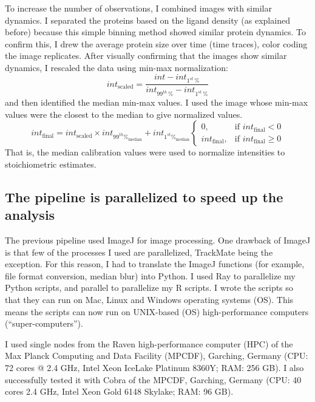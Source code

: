To increase the number of observations, I combined images with similar dynamics. I separated the proteins based on the ligand density (as explained before) because this simple binning method showed similar protein dynamics. To confirm this, I drew the average protein size over time (time traces), color coding the image replicates. After visually confirming that the images show similar dynamics, I rescaled the data using min-max normalization:
\begin{equation*}
int_\text{scaled} = \frac{int - int_{1^{st}\,\%}}{int_{99^{th}\,\%} - int_{1^{st}\,\%}}
\end{equation*}
and then identified the median min-max values. I used the image whose min-max values were the closest to the median to give normalized values.
\begin{equation*}
int_\text{final} = int_\text{scaled} \times int_{99^{th} \%_\text{median}}+int_{1^{st} \%_\text{median}}
\left\{\begin{array}{lr}
0, & \text{if }int_\text{final} < 0\\
int_\text{final}, & \text{if }int_\text{final} \geq 0
\end{array}\right.
\end{equation*}
That is, the median calibration values were used to normalize intensities to stoichiometric estimates.

\subsection{The pipeline is parallelized to speed up the analysis}
The previous pipeline used ImageJ for image processing. One drawback of ImageJ is that few of the processes I used are parallelized, TrackMate being the exception. For this reason, I had to translate the ImageJ functions (for example, file format conversion, median blur) into Python. I used Ray to parallelize my Python scripts, and parallel to parallelize my R scripts. I wrote the scripts so that they can run on Mac, Linux and Windows operating systems (OS). This means the scripts can now run on UNIX-based (OS) high-performance computers (“super-computers”).

I used single nodes from the Raven high-performance computer (HPC) of the Max Planck Computing and Data Facility (MPCDF), Garching, Germany (CPU: 72 cores @ 2.4 GHz, Intel Xeon IceLake Platinum 8360Y; RAM: 256 GB). I also successfully tested it with Cobra of the MPCDF, Garching, Germany (CPU: 40 cores \@ 2.4 GHz, Intel Xeon Gold 6148 Skylake; RAM: 96 GB).

